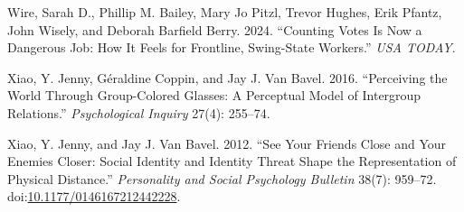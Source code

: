 \documentclass[
  12pt,
  letterpaper,
]{article}
\newlength{\cslhangindent}
\newenvironment{CSLReferences}[2] %
 {\begin{list}{}{%
  \setlength{\itemindent}{0pt}
  \setlength{\leftmargin}{0pt}
  \setlength{\parsep}{0pt}
  \ifodd #1
   \setlength{\leftmargin}{\cslhangindent}
   \setlength{\itemindent}{-1\cslhangindent}
  \fi
  \setlength{\itemsep}{#2\baselineskip}}}
 {\end{list}}
\begin{document}
\begin{CSLReferences}{1}{1}
Wire, Sarah D., Phillip M. Bailey, Mary Jo Pitzl, Trevor Hughes, Erik
Pfantz, John Wisely, and Deborah Barfield Berry. 2024. {``Counting Votes
Is Now a Dangerous Job: How It Feels for Frontline, Swing-State
Workers.''} \emph{USA TODAY}.

Xiao, Y. Jenny, Géraldine Coppin, and Jay J. Van Bavel. 2016.
{``Perceiving the {World Through Group-Colored Glasses}: {A Perceptual
Model} of {Intergroup Relations}.''} \emph{Psychological Inquiry} 27(4):
255--74.

Xiao, Y. Jenny, and Jay J. Van Bavel. 2012. {``See {Your Friends Close}
and {Your Enemies Closer}: {Social Identity} and {Identity Threat Shape}
the {Representation} of {Physical Distance}.''} \emph{Personality and
Social Psychology Bulletin} 38(7): 959--72.
doi:\href{https://doi.org/10.1177/0146167212442228}{10.1177/0146167212442228}.

\end{CSLReferences}
\end{document}
